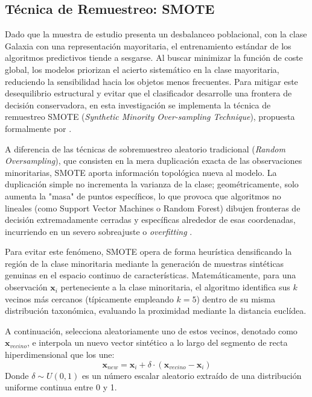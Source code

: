 \documentclass[12pt, a4paper]{report}
\begin{document}
\subsection{Técnica de Remuestreo: SMOTE}
\label{sec:smote}

Dado que la muestra de estudio presenta un desbalanceo poblacional, con la clase Galaxia con una representación mayoritaria, el entrenamiento estándar de los algoritmos predictivos tiende a sesgarse. Al buscar minimizar la función de coste global, los modelos priorizan el acierto sistemático en la clase mayoritaria, reduciendo la sensibilidad hacia los objetos menos frecuentes. Para mitigar este desequilibrio estructural y evitar que el clasificador desarrolle una frontera de decisión conservadora, en esta investigación se implementa la técnica de remuestreo SMOTE (\textit{Synthetic Minority Over-sampling Technique}), propuesta formalmente por \citet{chawla2002}.

A diferencia de las técnicas de sobremuestreo aleatorio tradicional (\textit{Random Oversampling}), que consisten en la mera duplicación exacta de las observaciones minoritarias, SMOTE aporta información topológica nueva al modelo. La duplicación simple no incrementa la varianza de la clase; geométricamente, solo aumenta la "masa" de puntos específicos, lo que provoca que algoritmos no lineales (como Support Vector Machines o Random Forest) dibujen fronteras de decisión extremadamente cerradas y específicas alrededor de esas coordenadas, incurriendo en un severo sobreajuste o \textit{overfitting} \citep{he2009}. 

Para evitar este fenómeno, SMOTE opera de forma heurística densificando la región de la clase minoritaria mediante la generación de muestras sintéticas genuinas en el espacio continuo de características. Matemáticamente, para una observación $\mathbf{x}_i$ perteneciente a la clase minoritaria, el algoritmo identifica sus $k$ vecinos más cercanos (típicamente empleando $k=5$) dentro de su misma distribución taxonómica, evaluando la proximidad mediante la distancia euclídea. 

A continuación, selecciona aleatoriamente uno de estos vecinos, denotado como $\mathbf{x}_{vecino}$, e interpola un nuevo vector sintético a lo largo del segmento de recta hiperdimensional que los une:
\begin{equation}
    \mathbf{x}_{new} = \mathbf{x}_i + \delta \cdot (\mathbf{x}_{vecino} - \mathbf{x}_i)
\end{equation}
Donde $\delta \sim U(0,1)$ es un número escalar aleatorio extraído de una distribución uniforme continua entre 0 y 1. 
\end{document}
